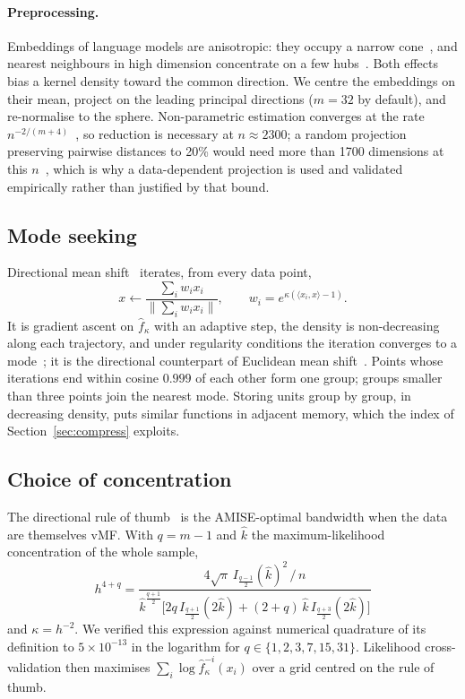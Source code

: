 \documentclass[10pt,twocolumn]{article}
\theoremstyle{definition}
\theoremstyle{remark}
\begin{document}
\paragraph{Preprocessing.}
Embeddings of language models are anisotropic: they occupy a narrow cone~\cite{ethayarajh2019contextual}, and nearest neighbours in high dimension concentrate on a few hubs~\cite{radovanovic2010hubs}.
Both effects bias a kernel density toward the common direction.
We centre the embeddings on their mean, project on the leading principal directions ($m=32$ by default), and re-normalise to the sphere.
Non-parametric estimation converges at the rate $n^{-2/(m+4)}$~\cite{stone1980}, so reduction is necessary at $n\approx 2300$; a random projection preserving pairwise distances to 20\% would need more than 1700 dimensions at this $n$~\cite{dasgupta2003jl}, which is why a data-dependent projection is used and validated empirically rather than justified by that bound.

\subsection{Mode seeking}
Directional mean shift~\cite{zhang2021directional} iterates, from every data point,
\begin{equation}\label{eq:ms}
x\leftarrow\frac{\sum_i w_i x_i}{\bigl\|\sum_i w_i x_i\bigr\|},\qquad w_i=e^{\kappa(\langle x_i,x\rangle-1)} .
\end{equation}
It is gradient ascent on $\hat f_\kappa$ with an adaptive step, the density is non-decreasing along each trajectory, and under regularity conditions the iteration converges to a mode~\cite{zhang2021directional}; it is the directional counterpart of Euclidean mean shift~\cite{fukunaga1975,cheng1995,comaniciu2002}.
Points whose iterations end within cosine $0.999$ of each other form one group; groups smaller than three points join the nearest mode.
Storing units group by group, in decreasing density, puts similar functions in adjacent memory, which the index of Section~\ref{sec:compress} exploits.

\subsection{Choice of concentration}
The directional rule of thumb~\cite{garciaportugues2013} is the AMISE-optimal bandwidth when the data are themselves vMF.
With $q=m-1$ and $\hat k$ the maximum-likelihood concentration of the whole sample,
\begin{equation}
h^{4+q}=\frac{4\sqrt\pi\, I_{\frac{q-1}{2}}(\hat k)^2\,/\,n}{\hat k^{\frac{q+1}{2}}\bigl[2q\,I_{\frac{q+1}{2}}(2\hat k)+(2+q)\,\hat k\, I_{\frac{q+3}{2}}(2\hat k)\bigr]}
\end{equation}
and $\kappa=h^{-2}$.
We verified this expression against numerical quadrature of its definition to $5\times10^{-13}$ in the logarithm for $q\in\{1,2,3,7,15,31\}$.
Likelihood cross-validation then maximises $\sum_i\log\hat f^{-i}_\kappa(x_i)$ over a grid centred on the rule of thumb.
\end{document}
